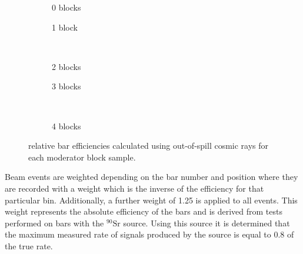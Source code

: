 \begin{figure}[t]
  \begin{subfigure}[t]{.5\textwidth}
    \begin{adjustbox}{max totalsize=\textwidth, center}
      
    \end{adjustbox}
    \caption{0 blocks}
  \end{subfigure}
  \hfill
  \begin{subfigure}[t]{.5\textwidth}
    \begin{adjustbox}{max totalsize=\textwidth, center}
            
    \end{adjustbox}
    \caption{1 block}
  \end{subfigure} \\
  \begin{subfigure}[t]{.5\textwidth}
    \begin{adjustbox}{max totalsize=\textwidth, center}
      
    \end{adjustbox}
    \caption{2 blocks}
  \end{subfigure}
  \hfill
  \begin{subfigure}[t]{.5\textwidth}
    \begin{adjustbox}{max totalsize=\textwidth, center}
      
    \end{adjustbox}
    \caption{3 blocks}
  \end{subfigure} \\

  \begin{subfigure}[t]{\textwidth}
    \begin{adjustbox}{max totalsize=.5\textwidth, center}
      
    \end{adjustbox}
    \caption{4 blocks}
  \end{subfigure}

  \caption[\SFour relative bar efficiencies]{\SFour relative bar efficiencies calculated using out-of-spill cosmic rays for each moderator block sample.}
  \label{fig:barEff}
\end{figure}

Beam events are weighted depending on the bar number and position where they are recorded with a weight which is the inverse of the efficiency for that particular bin.
Additionally, a further weight of \num{1.25} is applied to all events.
This weight represents the absolute efficiency of the bars and is derived from tests performed on \SFour bars with the $^{90}\text{Sr}$ source.
Using this source it is determined that the maximum measured rate of signals produced by the source is equal to \num{0.8} of the true rate.

